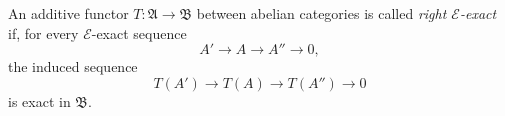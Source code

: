 An additive functor $T : \mathfrak{A} \to \mathfrak{B}$ between abelian categories is called \emph{right $\mathcal{E}$-exact} if, for every $\mathcal{E}$-exact sequence
$$A' \longrightarrow A \longrightarrow A'' \longrightarrow 0,$$
the induced sequence
$$T(A') \longrightarrow T(A) \longrightarrow T(A'') \longrightarrow 0$$
is exact in $\mathfrak{B}$.